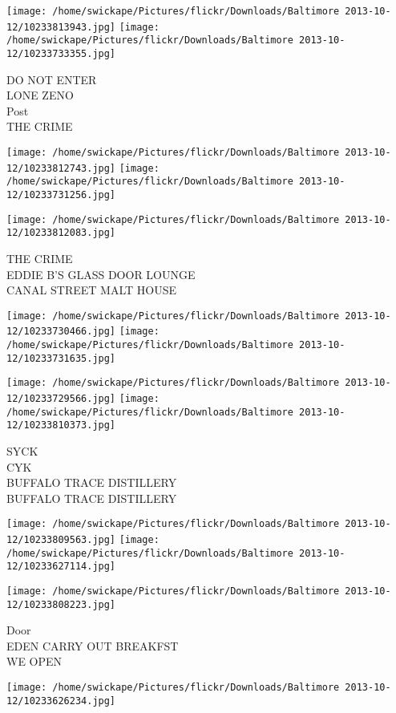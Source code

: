 \documentclass[10pt,letterpaper]{article}
\begin{document}
\texttt{[image: /home/swickape/Pictures/flickr/Downloads/Baltimore 2013-10-12/10233813943.jpg]}
\texttt{[image: /home/swickape/Pictures/flickr/Downloads/Baltimore 2013-10-12/10233733355.jpg]}

DO NOT ENTER\\
LONE ZENO\\
Post\\
THE CRIME
\pagebreak

\texttt{[image: /home/swickape/Pictures/flickr/Downloads/Baltimore 2013-10-12/10233812743.jpg]}
\texttt{[image: /home/swickape/Pictures/flickr/Downloads/Baltimore 2013-10-12/10233731256.jpg]}

\vspace{0.25in}
\texttt{[image: /home/swickape/Pictures/flickr/Downloads/Baltimore 2013-10-12/10233812083.jpg]}

THE CRIME\\
EDDIE B'S GLASS DOOR LOUNGE\\
CANAL STREET MALT HOUSE
\pagebreak

\texttt{[image: /home/swickape/Pictures/flickr/Downloads/Baltimore 2013-10-12/10233730466.jpg]}
\texttt{[image: /home/swickape/Pictures/flickr/Downloads/Baltimore 2013-10-12/10233731635.jpg]}

\texttt{[image: /home/swickape/Pictures/flickr/Downloads/Baltimore 2013-10-12/10233729566.jpg]}
\texttt{[image: /home/swickape/Pictures/flickr/Downloads/Baltimore 2013-10-12/10233810373.jpg]}

SYCK\\
CYK\\
BUFFALO TRACE DISTILLERY\\
BUFFALO TRACE DISTILLERY
\pagebreak

\texttt{[image: /home/swickape/Pictures/flickr/Downloads/Baltimore 2013-10-12/10233809563.jpg]}
\texttt{[image: /home/swickape/Pictures/flickr/Downloads/Baltimore 2013-10-12/10233627114.jpg]}

\texttt{[image: /home/swickape/Pictures/flickr/Downloads/Baltimore 2013-10-12/10233808223.jpg]}

Door\\
EDEN CARRY OUT BREAKFST\\
WE OPEN
\pagebreak

\texttt{[image: /home/swickape/Pictures/flickr/Downloads/Baltimore 2013-10-12/10233626234.jpg]}
\end{document}
